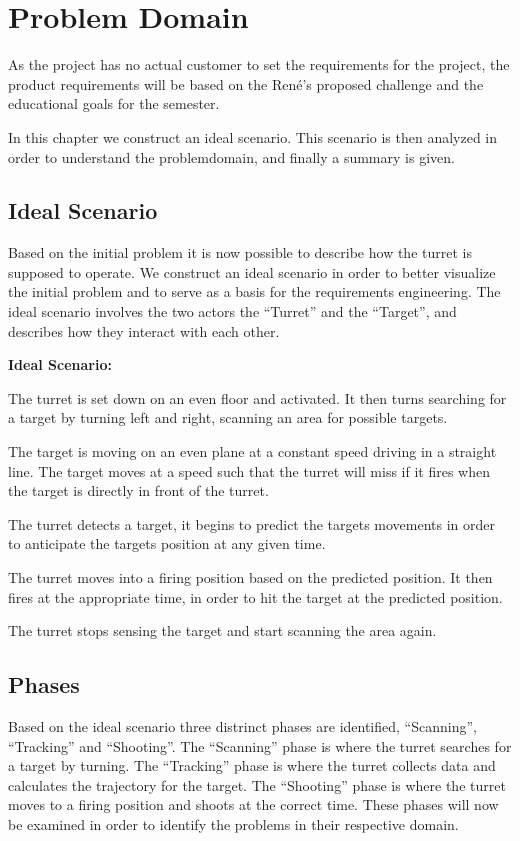 \chapter{Problem Domain}
As the project has no actual customer to set the requirements for the project,
the product requirements will be based on the Ren\'e's proposed challenge and
the educational goals for the semester.\nl

In this chapter we construct an ideal scenario. This scenario is then analyzed in order to
understand the problemdomain, and finally a summary is given.

\section{Ideal Scenario}
Based on the initial problem it is now possible to describe how the turret is
supposed to operate. We construct an ideal scenario in order to better
visualize the initial problem and to serve as a basis for the requirements engineering.
The ideal scenario involves the two actors the ``Turret'' and the ``Target'',
 and
describes how they interact with each other.

\begin{center}
\colorbox{diff}{
\begin{minipage}{0.8\linewidth}
\textbf{Ideal Scenario:}

The turret is set down on an even floor and activated. It then turns searching
for a target by turning left and right, scanning an area for possible
targets.\nl

The target is moving on an even plane at a constant speed driving in a straight
line. The target moves at a speed such that the turret will miss if it fires
when the target is directly in front of the turret.\nl

The turret detects a target, it begins to predict the targets movements in
order to anticipate the targets position at any given time.\nl

The turret moves into a firing position based on the predicted position. It then
fires at the appropriate time, in order to hit the target at the predicted
position.\nl

The turret stops sensing the target and start scanning the area again.

\end{minipage}
}
\end{center}


\section{Phases}
Based on the ideal scenario three distrinct phases are identified,
``Scanning'', ``Tracking'' and ``Shooting''. The ``Scanning'' phase is where
the turret searches for a target by turning. The ``Tracking'' phase is where the
turret collects data and calculates the trajectory for the target. The
``Shooting'' phase is where the turret moves to a firing position and shoots at
the correct time. These phases will now be examined in order to identify the
problems in their respective domain.


